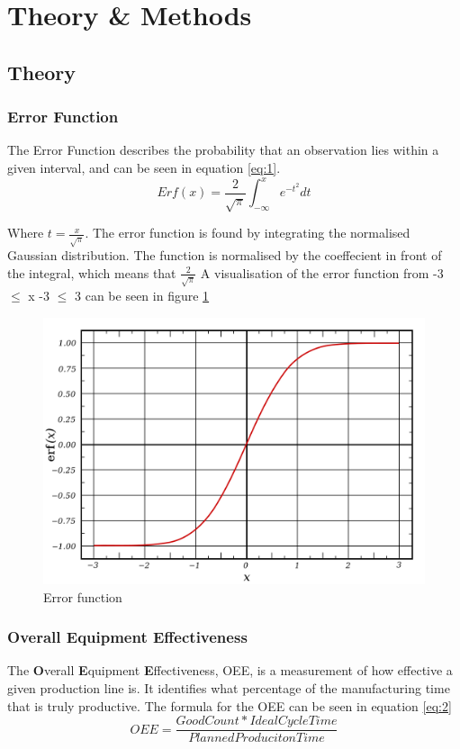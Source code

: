 \section{Theory \& Methods}

\subsection{Theory}

\subsubsection{Error Function}
The Error Function describes the probability that an observation lies within
a given interval, and can be seen in equation \ref{eq:1}.
\begin{equation} \label{eq:1}
    Erf(x)=\frac{2}{\sqrt{\pi}} \int_{-\infty}^x e^{-t^2} dt
\end{equation}

Where \(t=\frac{x}{\sqrt{\pi}}\). The error function is found by integrating
the normalised Gaussian distribution. The function is normalised by the
coeffecient in front of the integral, which means that \(\frac{2}{\sqrt{\pi}}\)
A visualisation of the error function from -3 $\leq$ x -3 $\leq$ 3 can be seen
in figure \ref{figure:error_function}

\begin{figure}[ht]
    \centering
    \includegraphics[scale=0.3]{images/error_function.png}
    \caption{Error function}
    \label{figure:error_function}
\end{figure}

\subsubsection{Overall Equipment Effectiveness}
The \textbf{O}verall \textbf{E}quipment \textbf{E}ffectiveness, OEE, is a
measurement of how effective a given production line is. It identifies what
percentage of the manufacturing time that is truly productive. The formula for
the OEE can be seen in equation \ref{eq:2}
\begin{equation} \label{eq:2}
    OEE = \frac{Good Count * Ideal Cycle Time}{Planned Produciton Time}
\end{equation}

